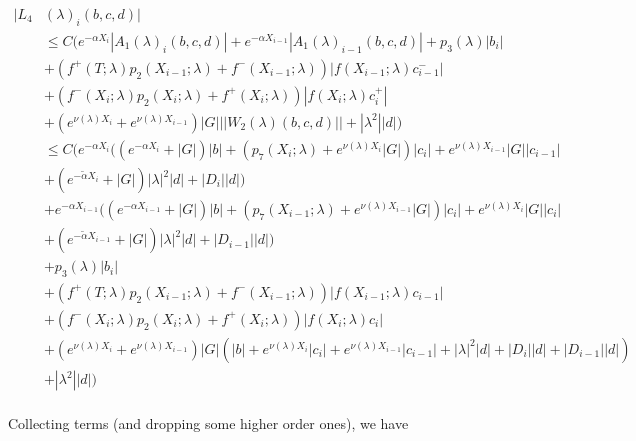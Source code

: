 \documentclass[12pt]{article}
\begin{document}
\begin{enumerate}
\begin{align*}
|L_4&(\lambda)_i(b, c, d)|\\ 
&\leq C \Big( e^{-\alpha X_i} |A_1(\lambda)_i(b, c, d)| +  e^{-\alpha X_{i-1}} |A_1(\lambda)_{i-1}(b, c, d)| + p_3(\lambda) |b_i| \\
&+ (f^+(T; \lambda) p_2(X_{i-1}; \lambda) + f^-(X_{i-1}; \lambda)) |f(X_{i-1}; \lambda) c_{i-1}^-| \\
&+ (f^-(X_i; \lambda) p_2(X_i; \lambda) + f^+(X_i; \lambda)) |f(X_i; \lambda) c_i^+| \\
&+ (e^{\nu(\lambda)X_i} + e^{\nu(\lambda)X_{i-1}}) |G| ||W_2(\lambda)(b,c,d)|| + |\lambda^2| |d| \Big) \\
&\leq C \Big( e^{-\alpha X_i} ( (e^{-\alpha X_i} + |G|) |b| 
+ ( p_7(X_i; \lambda) + e^{\nu(\lambda)X_i} |G|) |c_i| + e^{\nu(\lambda)X_{i-1}} |G| |c_{i-1}| \\
&+ (e^{-\tilde{\alpha} X_i} + |G|) |\lambda|^2 |d| + |D_i||d| ) \\
&+ e^{-\alpha X_{i-1}} ( (e^{-\alpha X_{i-1}} + |G|) |b| 
+ ( p_7(X_{i-1}; \lambda) + e^{\nu(\lambda)X_{i-1}} |G|) |c_i| + e^{\nu(\lambda)X_i} |G| |c_i| \\
&+ (e^{-\tilde{\alpha} X_{i-1}} + |G|) |\lambda|^2 |d| + |D_{i-1}||d| ) \\
&+ p_3(\lambda) |b_i| \\
&+ (f^+(T; \lambda) p_2(X_{i-1}; \lambda) + f^-(X_{i-1}; \lambda)) |f(X_{i-1}; \lambda) c_{i-1}| \\
&+ (f^-(X_i; \lambda) p_2(X_i; \lambda) + f^+(X_i; \lambda)) |f(X_i; \lambda) c_i| \\
&+ (e^{\nu(\lambda)X_i} + e^{\nu(\lambda)X_{i-1}}) |G| ( |b| + e^{\nu(\lambda)X_i} |c_i| + e^{\nu(\lambda)X_{i-1}} |c_{i-1}| 
+ |\lambda|^2 |d| + |D_i||d| + |D_{i-1}||d|)\\ 
&+ |\lambda^2| |d| \Big) \\
\end{align*}

Collecting terms (and dropping some higher order ones), we have


\end{enumerate}
\end{document}
